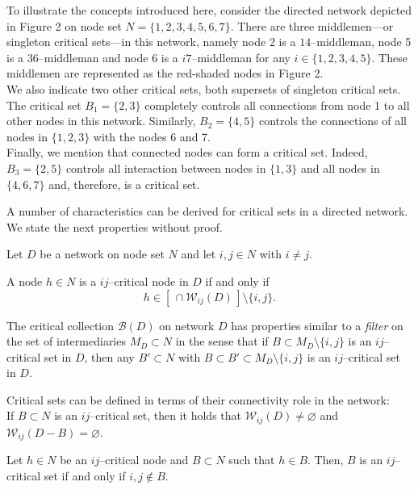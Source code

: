 \begin{example} \label{ex:Figure1}
To illustrate the concepts introduced here, consider the directed network depicted in Figure 2 on node set $N = \{ 1,2,3,4,5,6,7 \}$. There are three middlemen---or singleton critical sets---in this network, namely node 2 is a $14$--middleman, node 5 is a $36$--middleman and node 6 is a $i7$--middleman for any $i \in \{ 1,2,3,4,5 \}$. These middlemen are represented as the red-shaded nodes in Figure 2.
\\
We also indicate two other critical sets, both supersets of singleton critical sets. The critical set $B_1 = \{ 2,3 \}$ completely controls all connections from node 1 to all other nodes in this network. Similarly, $B_2 = \{ 4,5 \}$ controls the connections of all nodes in $\{ 1,2,3 \}$ with the nodes 6 and 7.
\\
Finally, we mention that connected nodes can form a critical set. Indeed, $B_3 = \{ 2,5 \}$ controls all interaction between nodes in $\{1,3 \}$ and all nodes in $\{ 4,6,7 \}$ and, therefore, is a critical set.
\end{example}
A number of characteristics can be derived for critical sets in a directed network. We state the next properties without proof.
\begin{property} \label{prop:blocks}
Let $D$ be a network on node set $N$ and let $i,j \in N$ with $i \neq j$.
\begin{numm}
\item A node $h \in N$ is a $ij$--critical node in $D$ if and only if
\[
h \in \left[ \, \cap \mathcal{W}_{ij} (D) \, \right] \setminus \{i,j\} .
\]

\item The critical collection $\mathcal{B} (D)$ on network $D$ has properties similar to a \emph{filter} on the set of intermediaries $M_D \subset N$ in the sense that if $B \subset M_D \setminus \{ i,j \}$ is an $ij$--critical set in $D$, then any $B' \subset N$ with $B \subset B' \subset M_D \setminus \{ i,j \}$ is an $ij$--critical set in $D$.

\item Critical sets can be defined in terms of their connectivity role in the network:
\\
If $B \subset N$ is an $ij$--critical set, then it holds that $\mathcal{W}_{ij}(D) \neq \varnothing$ and $\mathcal{W}_{ij}(D - B) = \varnothing$.

\item Let $h \in N$ be an $ij$--critical node and $B \subset N$ such that $h \in B$. Then, $B$ is an $ij$--critical set if and only if $i,j \notin B$.
\end{numm}
\end{property}
